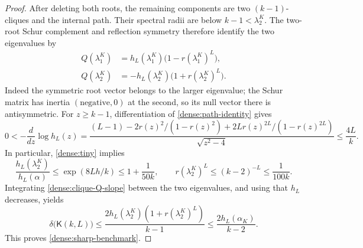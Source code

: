 \documentclass[11pt,a4paper]{article}
\numberwithin{equation}{section}
\theoremstyle{definition}
\theoremstyle{remark}
\newcommand{\Kite}{\mathsf{K}}
\begin{document}
\begin{proof}
After deleting both roots, the remaining components are two
$(k-1)$-cliques and the internal path.  Their spectral radii are
below $k-1<\lambda_2^K$.  The two-root Schur complement and reflection
symmetry therefore identify the two eigenvalues by
\begin{align*}
 Q(\lambda_1^K)
 &=h_L(\lambda_1^K)\bigl(1-r(\lambda_1^K)^L\bigr),\\
 Q(\lambda_2^K)
 &=-h_L(\lambda_2^K)\bigl(1+r(\lambda_2^K)^L\bigr).
\end{align*}
Indeed the symmetric root vector belongs to the larger eigenvalue;
the Schur matrix has inertia $(\text{negative},0)$ at the second,
so its null vector there is antisymmetric.
For $z\ge k-1$, differentiation of \eqref{dense:path-identity} gives
\begin{equation}\label{dense:log-h}
 0<-\frac{d}{dz}\log h_L(z)
 =\frac{(L-1)-2r(z)^2/(1-r(z)^2)
             +2Lr(z)^{2L}/(1-r(z)^{2L})}
        {\sqrt{z^2-4}}
 \le\frac{4L}{k}.
\end{equation}
In particular, \eqref{dense:tiny} implies
\[
 \frac{h_L(\lambda_2^K)}{h_L(\alpha)}
 \le\exp(8Lh/k)\le1+\frac1{50k},
 \qquad
 r(\lambda_2^K)^L\le(k-2)^{-L}\le\frac1{100k}.
\]
Integrating \eqref{dense:clique-Q-slope} between the two eigenvalues,
and using that $h_L$ decreases, yields
\[
 \delta\bigl(\Kite(k,L)\bigr)
 \le\frac{2h_L(\lambda_2^K)(1+r(\lambda_2^K)^L)}{k-1}
 \le\frac{2h_L(\alpha_K)}{k-2}.
\]
This proves \eqref{dense:sharp-benchmark}.
\end{proof}
\end{document}
